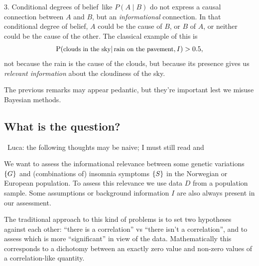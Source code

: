 \documentclass[\ifafour a4paper,12pt,\else a5paper,10pt,\fi%
onecolumn,oneside,article,%
british%
]{memoir}
\theoremstyle{remark}
\theoremstyle{innote}
\newcommand*{\citep}{\parencites}
\DeclarePairedDelimiter\set{\{}{\}}
\newcommand*{\p}{\mathrm{P}}%
\renewcommand*{\|}{\mathpunct{|}}
\newcommand*{\puzzle}{\maltese}
\newcommand{\mynote}[1]{ {\color{notecolour}\puzzle\ #1}}
\newcommand*{\dob}{degree of belief}
\newcommand*{\dobs}{degrees of belief}
\newcommand*{\yD}{D}
\newcommand*{\yG}{G}
\newcommand*{\yS}{S}
\newcommand*{\yI}{I}
\begin{document}
\medskip

3. Conditional \dobs\ like $P(A \| B)$ do not express a causal connection
between $A$ and $B$, but an \emph{informational} connection. In that
conditional \dob, $A$ could be the cause of $B$, or $B$ of $A$, or neither
could be the cause of the other. The classical example of this is
\begin{equation}
  \label{eq:rain_clouds}
  \p(\text{\small clouds in the sky} \| \text{\small rain on the pavement}, I) > 0.5,
\end{equation}
not because the rain is the cause of the clouds, but because its presence gives us
\emph{relevant information} about the cloudiness of the sky.

\medskip

The previous remarks may appear pedantic, but they're important lest we
misuse Bayesian methods.

\subsection{What is the question?}
\label{sec:what_question}

\mynote{Luca: the following thoughts may be naive; I must still read
  \citep{stingoetal2015} and \citep{bushetal2012}}

We want to assess the informational relevance between some genetic
variations $\set{\yG}$ and (combinations of) insomnia symptoms $\set{\yS}$
in the Norwegian or European population. To assess this relevance we use
data $\yD$ from a population sample. Some assumptions or background
information $\yI$ are also always present in our assessment.

The traditional approach to this kind of problems is to set two hypotheses
against each other: \enquote{there is a correlation} vs \enquote{there
  isn't a correlation}, and to assess which is more \enquote{significant}
in view of the data. Mathematically this corresponds to a dichotomy between
an exactly zero value and non-zero values of a correlation-like quantity.
\end{document}
